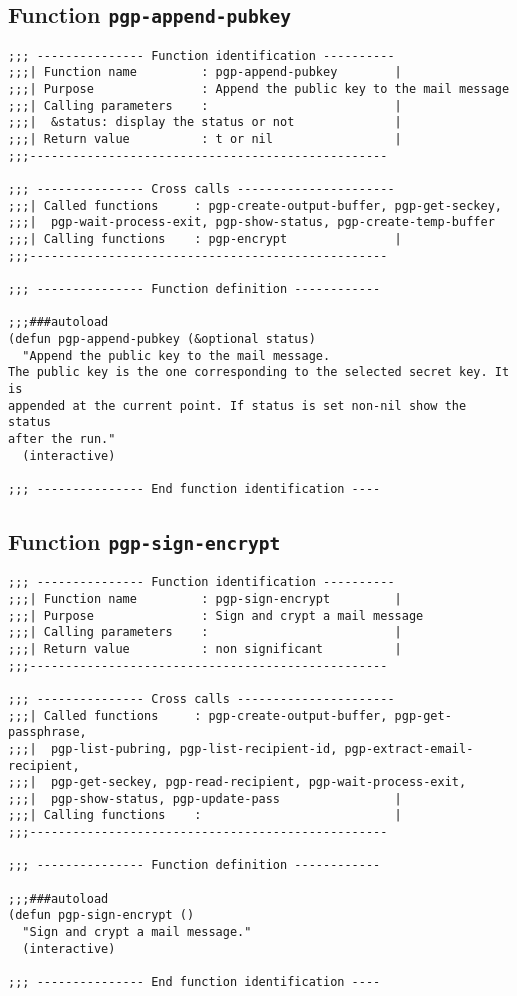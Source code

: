 \subsection{Function {\tt pgp-append-pubkey}}
\leavevmode
\begin{verbatim}
;;; --------------- Function identification ----------
;;;| Function name         : pgp-append-pubkey        |
;;;| Purpose               : Append the public key to the mail message
;;;| Calling parameters    :                          |
;;;|  &status: display the status or not              |
;;;| Return value          : t or nil                 |
;;;--------------------------------------------------

;;; --------------- Cross calls ----------------------
;;;| Called functions     : pgp-create-output-buffer, pgp-get-seckey,
;;;|  pgp-wait-process-exit, pgp-show-status, pgp-create-temp-buffer
;;;| Calling functions    : pgp-encrypt               |
;;;--------------------------------------------------

;;; --------------- Function definition ------------

;;;###autoload
(defun pgp-append-pubkey (&optional status)
  "Append the public key to the mail message.
The public key is the one corresponding to the selected secret key. It is
appended at the current point. If status is set non-nil show the status
after the run."
  (interactive)

;;; --------------- End function identification ----
\end{verbatim}
\subsection{Function {\tt pgp-sign-encrypt}}
\leavevmode
\begin{verbatim}
;;; --------------- Function identification ----------
;;;| Function name         : pgp-sign-encrypt         |
;;;| Purpose               : Sign and crypt a mail message
;;;| Calling parameters    :                          |
;;;| Return value          : non significant          |
;;;--------------------------------------------------

;;; --------------- Cross calls ----------------------
;;;| Called functions     : pgp-create-output-buffer, pgp-get-passphrase,
;;;|  pgp-list-pubring, pgp-list-recipient-id, pgp-extract-email-recipient,
;;;|  pgp-get-seckey, pgp-read-recipient, pgp-wait-process-exit,
;;;|  pgp-show-status, pgp-update-pass                |
;;;| Calling functions    :                           |
;;;--------------------------------------------------

;;; --------------- Function definition ------------

;;;###autoload
(defun pgp-sign-encrypt ()
  "Sign and crypt a mail message."
  (interactive)

;;; --------------- End function identification ----
\end{verbatim}
